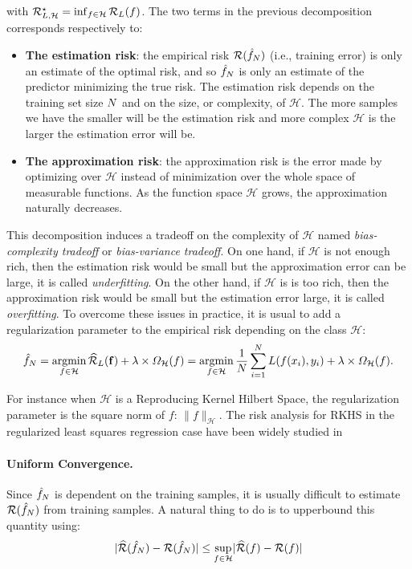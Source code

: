 with $\mathcal{R}_{L,\mathcal{H}}^\star = \inf_{f\in\mathcal{H}}\mathcal{R}_L(f)$. The two terms in the previous decomposition corresponds respectively to:
\begin{itemize}
    \item \textbf{The estimation risk}:  the empirical risk $\mathcal{R}(\hat{f}_N)$ (i.e., training error) is only an estimate of the optimal risk, and so $\hat{f}_N$   is only an estimate of the predictor minimizing the true risk. The estimation risk depends on the training set size $N$ and on the size, or complexity, of  $\mathcal{H}$.  The more samples we have the smaller will be the estimation risk and more complex $\mathcal{H}$ is the larger the estimation error will be.
    \item \textbf{The approximation risk}: the approximation risk is the error made by optimizing over $\mathcal{H}$ instead of minimization over the whole space of measurable functions. As  the function space $\mathcal{H}$ grows, the approximation naturally decreases. 
\end{itemize}

This decomposition induces a tradeoff on the complexity of $\mathcal{H}$ named \emph{bias-complexity tradeoff} or \emph{bias-variance tradeoff}. On one hand, if $\mathcal{H}$ is not enough rich, then the estimation risk would be small but the approximation error can be large, it is called \emph{underfitting}. On the other hand, if $\mathcal{H}$ is is too rich, then the approximation risk would be small but the estimation error large, it is called \emph{overfitting}. To overcome these issues in practice, it is usual to add a regularization parameter to the empirical risk depending on the class $\mathcal{H}$:
\begin{align*}
    \hat{f}_N = \operatorname*{argmin}_{f\in\mathcal{H}}\widehat{\mathcal{R}}_{L}(\mathbf{f}) +\lambda\times\Omega_\mathcal{H}(f)= \operatorname*{argmin}_{f\in\mathcal{H}}\frac{1}{N}\sum_{i=1}^N L(f(x_i),y_i)+\lambda\times\Omega_\mathcal{H}(f).
\end{align*}

For instance when $\mathcal{H}$ is a Reproducing Kernel Hilbert Space, the regularization parameter is the square norm of $f$: $\lVert f\rVert_\mathcal{H}$. The risk analysis for RKHS in the regularized least squares regression case have been widely studied in~\cite{xxxx} 


\paragraph{Uniform Convergence.} Since $\hat{f}_N$ is dependent on the training samples, it is usually difficult to estimate $\mathcal{R}(\hat{f}_N)$ from training samples. A natural thing to do is to upperbound this quantity using:
\begin{align*}
    \lvert\widehat{\mathcal{R}}(\hat{f}_N) - \mathcal{R}(\hat{f}_N)\rvert\leq\sup_{f\in\mathcal{H}}    \lvert\widehat{\mathcal{R}}(f) - \mathcal{R}(f)\rvert
\end{align*}

